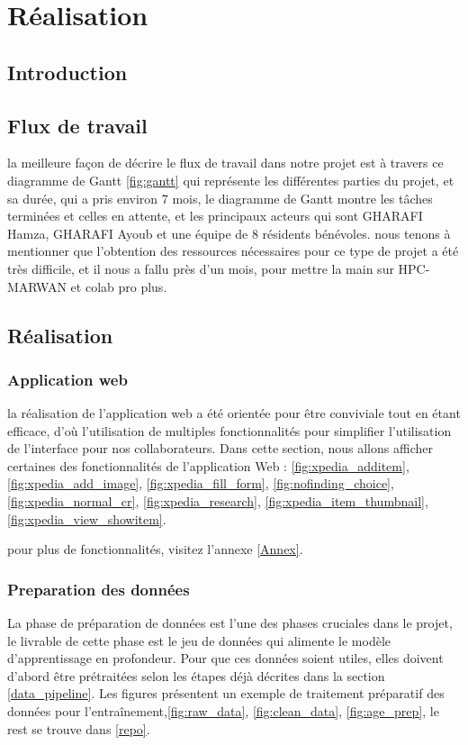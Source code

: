 \chapter{Réalisation}

\section*{Introduction}

\section{Flux de travail}
la meilleure façon de décrire le flux de travail dans notre projet est à travers ce diagramme de Gantt \ref{fig:gantt} qui représente les différentes parties du projet, et sa durée, qui a pris environ 7 mois, le diagramme de Gantt montre les tâches terminées et celles en attente, et les principaux acteurs qui sont GHARAFI Hamza, GHARAFI Ayoub et une équipe de 8 résidents bénévoles.
nous tenons à mentionner que l'obtention des ressources nécessaires pour ce type de projet a été très difficile, et il nous a fallu près d'un mois, pour mettre la main sur HPC-MARWAN et colab pro plus.

\section{Réalisation}
\subsection{Application web}
la réalisation de l'application web a été orientée pour être conviviale tout en étant efficace, d'où l'utilisation de multiples fonctionnalités pour simplifier l'utilisation de l'interface pour nos collaborateurs.
Dans cette section, nous allons afficher certaines des fonctionnalités de l'application Web : \ref{fig:xpedia_additem}, \ref{fig:xpedia_add_image}, \ref{fig:xpedia_fill_form}, \ref{fig:nofinding_choice},\ref{fig:xpedia_normal_cr}, \ref{fig:xpedia_research}, \ref{fig:xpedia_item_thumbnail}, \ref{fig:xpedia_view_showitem}.

pour plus de fonctionnalités, visitez l'annexe \ref{Annex}.


\subsection{Preparation des données}
La phase de préparation de données est l'une des phases cruciales dans le projet, le livrable de cette phase est le jeu de données qui alimente le modèle d'apprentissage en profondeur. Pour que ces données soient utiles, elles doivent d'abord être prétraitées selon les étapes déjà décrites dans la section \ref{data_pipeline}. Les figures présentent un exemple de traitement préparatif des données pour l'entraînement,\ref{fig:raw_data}, \ref{fig:clean_data}, \ref{fig:age_prep}, le rest se trouve dans \ref{repo}.

